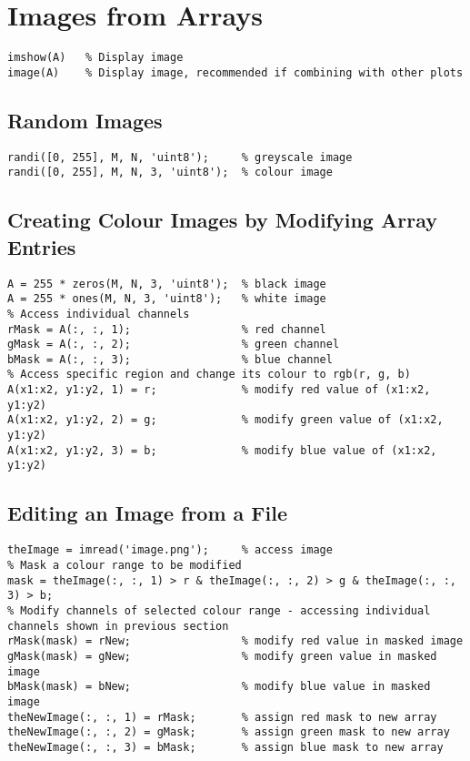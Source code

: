 \documentclass{article}
\begin{document}
\section*{Images from Arrays}
\begin{verbatim}
imshow(A)   % Display image
image(A)    % Display image, recommended if combining with other plots
\end{verbatim}
\subsection*{Random Images}
\begin{verbatim}
randi([0, 255], M, N, 'uint8');     % greyscale image
randi([0, 255], M, N, 3, 'uint8');  % colour image
\end{verbatim}
\subsection*{Creating Colour Images by Modifying Array Entries}
\begin{verbatim}
A = 255 * zeros(M, N, 3, 'uint8');  % black image
A = 255 * ones(M, N, 3, 'uint8');   % white image
% Access individual channels
rMask = A(:, :, 1);                 % red channel
gMask = A(:, :, 2);                 % green channel
bMask = A(:, :, 3);                 % blue channel
% Access specific region and change its colour to rgb(r, g, b)
A(x1:x2, y1:y2, 1) = r;             % modify red value of (x1:x2, y1:y2)
A(x1:x2, y1:y2, 2) = g;             % modify green value of (x1:x2, y1:y2)
A(x1:x2, y1:y2, 3) = b;             % modify blue value of (x1:x2, y1:y2)
\end{verbatim}
\subsection*{Editing an Image from a File}
\begin{verbatim}
theImage = imread('image.png');     % access image
% Mask a colour range to be modified
mask = theImage(:, :, 1) > r & theImage(:, :, 2) > g & theImage(:, :, 3) > b;
% Modify channels of selected colour range - accessing individual channels shown in previous section
rMask(mask) = rNew;                 % modify red value in masked image
gMask(mask) = gNew;                 % modify green value in masked image
bMask(mask) = bNew;                 % modify blue value in masked image
theNewImage(:, :, 1) = rMask;       % assign red mask to new array
theNewImage(:, :, 2) = gMask;       % assign green mask to new array
theNewImage(:, :, 3) = bMask;       % assign blue mask to new array
\end{verbatim}
\end{document}
